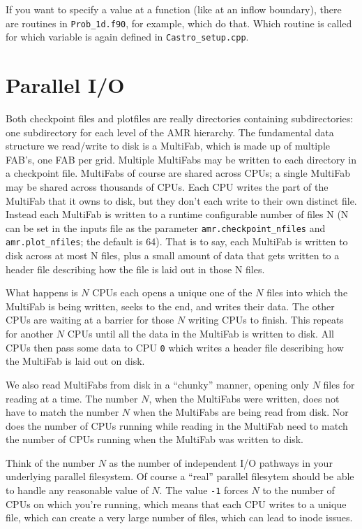 If you want to specify a value at a function (like at an inflow
boundary), there are routines in {\tt Prob\_1d.f90}, for example, which do
that. Which routine is called for which variable is again defined in
{\tt Castro\_setup.cpp}.

\section{Parallel I/O}

Both checkpoint files and plotfiles are really directories containing
subdirectories: one subdirectory for each level of the AMR hierarchy.
The fundamental data structure we read/write to disk is a MultiFab,
which is made up of multiple FAB's, one FAB per grid.  Multiple
MultiFabs may be written to each directory in a checkpoint file.
MultiFabs of course are shared across CPUs; a single MultiFab may be
shared across thousands of CPUs.  Each CPU writes the part of the
MultiFab that it owns to disk, but they don't each write to their own
distinct file.  Instead each MultiFab is written to a runtime
configurable number of files N (N can be set in the inputs file as the
parameter {\tt amr.checkpoint\_nfiles} and {\tt amr.plot\_nfiles}; the
default is 64).  That is to say, each MultiFab is written to disk
across at most N files, plus a small amount of data that gets written
to a header file describing how the file is laid out in those N files.

What happens is $N$ CPUs each opens a unique one of the $N$ files into
which the MultiFab is being written, seeks to the end, and writes
their data.  The other CPUs are waiting at a barrier for those $N$
writing CPUs to finish.  This repeats for another $N$ CPUs until all the
data in the MultiFab is written to disk.  All CPUs then pass some data
to CPU {\tt 0} which writes a header file describing how the MultiFab is
laid out on disk.

We also read MultiFabs from disk in a ``chunky'' manner, opening only $N$
files for reading at a time.  The number $N$, when the MultiFabs were
written, does not have to match the number $N$ when the MultiFabs are
being read from disk.  Nor does the number of CPUs running while
reading in the MultiFab need to match the number of CPUs running when
the MultiFab was written to disk.

Think of the number $N$ as the number of independent I/O pathways in
your underlying parallel filesystem.  Of course a ``real'' parallel
filesytem should be able to handle any reasonable value of $N$.  The
value {\tt -1} forces $N$ to the number of CPUs on which you're
running, which means that each CPU writes to a unique file, which can
create a very large number of files, which can lead to inode issues.


